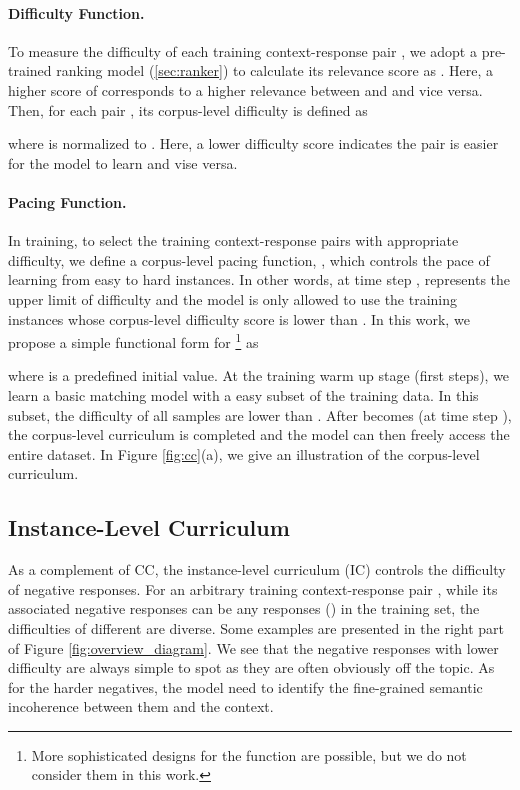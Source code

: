\documentclass[11pt,a4paper]{article}
\begin{document}
\paragraph{Difficulty Function.} To measure the difficulty of each training context-response pair , we adopt a pre-trained ranking model  (\cref{sec:ranker}) to calculate its relevance score as . Here, a higher score of  corresponds to a higher relevance between  and  and vice versa. Then, for each pair , its corpus-level difficulty  is defined as 


where  is normalized to . Here, a lower difficulty score indicates the pair  is easier for the model to learn and vise versa.


\paragraph{Pacing Function.} In training, to select the training context-response pairs with appropriate difficulty, we define a corpus-level pacing function, , which controls the pace of learning from easy to hard instances. In other words, at time step ,  represents the upper limit of difficulty and the model is only allowed to use the training instances  whose corpus-level difficulty score  is lower than . In this work, we propose a simple functional form for \footnote{More sophisticated designs for the function  are possible, but we do not consider them in this work.} as

where  is a predefined initial value. At the training warm up stage (first  steps), we learn a basic matching model with a easy subset of the training data. In this subset, the difficulty of all samples are lower than . After  becomes  (at time step ), the corpus-level curriculum is completed and the model can then freely access the entire dataset. In Figure \ref{fig:cc}(a), we give an illustration of the corpus-level curriculum.



\subsection{Instance-Level Curriculum}
\label{sec:ic}
As a complement of CC, the instance-level curriculum (IC) controls the difficulty of negative responses. For an arbitrary training context-response pair , while its associated negative responses can be any responses  () in the training set, the difficulties of different  are diverse. Some examples are presented in the right part of Figure \ref{fig:overview_diagram}. We see that the negative responses with lower difficulty are always simple to spot as they are often obviously off the topic. As for the harder negatives, the model need to identify the fine-grained semantic incoherence between them and the context.
\end{document}
